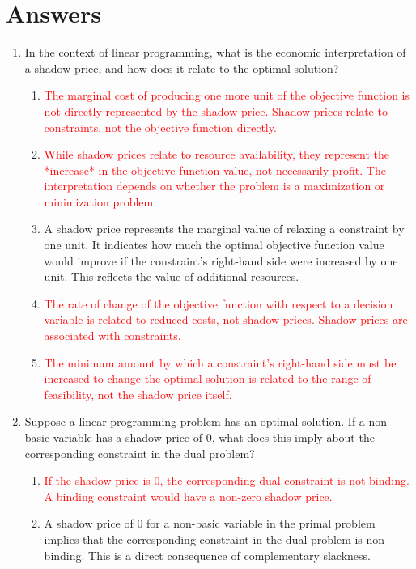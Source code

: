\documentclass{article}%
\newcommand{\incorrect}[1]{\textcolor{red}{#1}}
\begin{document}
\section{Answers}%
\label{sec:Answers}%
\begin{enumerate}%
\item In the context of linear programming, what is the economic interpretation of a shadow price, and how does it relate to the optimal solution?%
\begin{enumerate}%
\item \incorrect{The marginal cost of producing one more unit of the objective function is not directly represented by the shadow price. Shadow prices relate to constraints, not the objective function directly.}%
\item \incorrect{While shadow prices relate to resource availability, they represent the *increase* in the objective function value, not necessarily profit.  The interpretation depends on whether the problem is a maximization or minimization problem.}%
\item A shadow price represents the marginal value of relaxing a constraint by one unit.  It indicates how much the optimal objective function value would improve if the constraint's right-hand side were increased by one unit. This reflects the value of additional resources.%
\item \incorrect{The rate of change of the objective function with respect to a decision variable is related to reduced costs, not shadow prices. Shadow prices are associated with constraints.}%
\item \incorrect{The minimum amount by which a constraint's right-hand side must be increased to change the optimal solution is related to the range of feasibility, not the shadow price itself.}%
\end{enumerate}%
\vspace{1em}%
\item Suppose a linear programming problem has an optimal solution.  If a non-basic variable has a shadow price of 0, what does this imply about the corresponding constraint in the dual problem?%
\begin{enumerate}%
\item \incorrect{If the shadow price is 0, the corresponding dual constraint is not binding.  A binding constraint would have a non-zero shadow price.}%
\item A shadow price of 0 for a non-basic variable in the primal problem implies that the corresponding constraint in the dual problem is non-binding.  This is a direct consequence of complementary slackness.%

\end{enumerate}
\end{enumerate}
\end{document}
